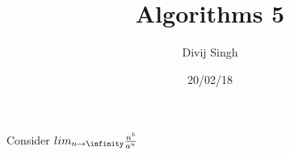 \documentclass{article}
\title{Algorithms 5}
\author{Divij Singh}
\date{20/02/18}
\begin{document}
	\maketitle
	
	\section{}
	Consider $lim_{n \rightarrow \infinity} \frac{n^b}{a^n}$
	
	
\end{document}
